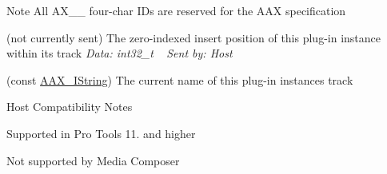 \begin{DoxyNote}{Note}
All \textquotesingle{}A\+X\+\_\+\+\_\+\textquotesingle{} four-\/char I\+Ds are reserved for the A\+A\+X specification 
\end{DoxyNote}
\begin{Desc}
\item[Enumerator]\par
\begin{description}
\item[{\em 
\hypertarget{a00206_afab5ea2cfd731fc8f163b6caa685406ea8158589897202759039f4e7c030d69f8}{}A\+A\+X\+\_\+e\+Notification\+Event\+\_\+\+Insert\+Position\+Changed\label{a00206_afab5ea2cfd731fc8f163b6caa685406ea8158589897202759039f4e7c030d69f8}
}](not currently sent) The zero-\/indexed insert position of this plug-\/in instance within its track {\itshape Data\+: {\ttfamily int32\+\_\+t}} ~\newline
 {\itshape Sent by\+: Host} \item[{\em 
\hypertarget{a00206_afab5ea2cfd731fc8f163b6caa685406ea32d343a1dd571309d5c857488ff00999}{}A\+A\+X\+\_\+e\+Notification\+Event\+\_\+\+Track\+Name\+Changed\label{a00206_afab5ea2cfd731fc8f163b6caa685406ea32d343a1dd571309d5c857488ff00999}
}](const \hyperlink{a00113}{A\+A\+X\+\_\+\+I\+String}) The current name of this plug-\/in instance\textquotesingle{}s track \begin{DoxyRefDesc}{Host Compatibility Notes}
\item[\hyperlink{a00380__compatibility_notes000030}{Host Compatibility Notes}]Supported in Pro Tools 11. and higher 

Not supported by Media Composer\end{DoxyRefDesc}



\end{description}
\end{Desc}
